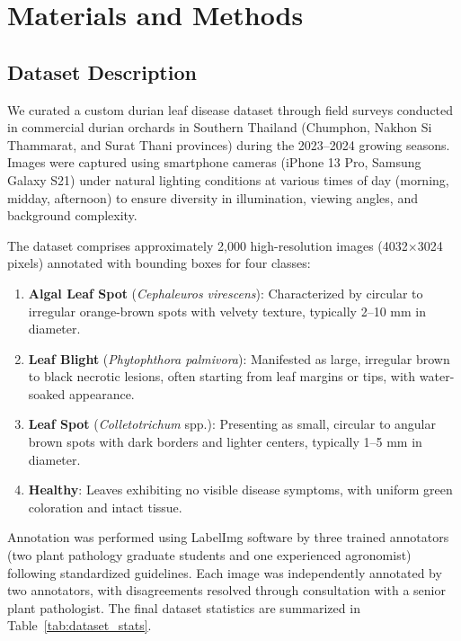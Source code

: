 \section{Materials and Methods}

\subsection{Dataset Description}

We curated a custom durian leaf disease dataset through field surveys conducted in commercial durian orchards in Southern Thailand (Chumphon, Nakhon Si Thammarat, and Surat Thani provinces) during the 2023--2024 growing seasons. Images were captured using smartphone cameras (iPhone 13 Pro, Samsung Galaxy S21) under natural lighting conditions at various times of day (morning, midday, afternoon) to ensure diversity in illumination, viewing angles, and background complexity.

The dataset comprises approximately 2,000 high-resolution images (4032$\times$3024 pixels) annotated with bounding boxes for four classes:

\begin{enumerate}
\item \textbf{Algal Leaf Spot} (\textit{Cephaleuros virescens}): Characterized by circular to irregular orange-brown spots with velvety texture, typically 2--10 mm in diameter.
\item \textbf{Leaf Blight} (\textit{Phytophthora palmivora}): Manifested as large, irregular brown to black necrotic lesions, often starting from leaf margins or tips, with water-soaked appearance.
\item \textbf{Leaf Spot} (\textit{Colletotrichum} spp.): Presenting as small, circular to angular brown spots with dark borders and lighter centers, typically 1--5 mm in diameter.
\item \textbf{Healthy}: Leaves exhibiting no visible disease symptoms, with uniform green coloration and intact tissue.
\end{enumerate}

Annotation was performed using LabelImg software by three trained annotators (two plant pathology graduate students and one experienced agronomist) following standardized guidelines. Each image was independently annotated by two annotators, with disagreements resolved through consultation with a senior plant pathologist. The final dataset statistics are summarized in Table~\ref{tab:dataset_stats}.

